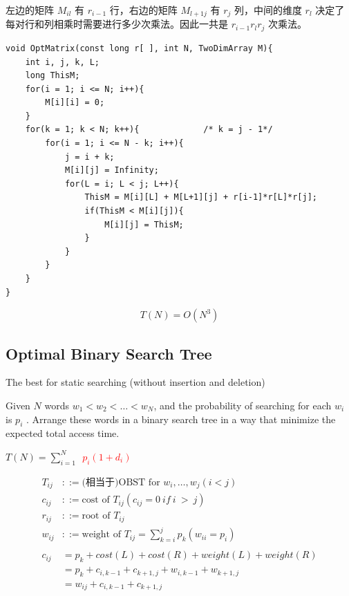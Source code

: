 \documentclass{article}
\begin{document}
左边的矩阵 $M_{il}$ 有 $r_{i-1}$ 行，右边的矩阵 $M_{l+1j}$ 有 $r_j$ 列，中间的维度 $r_l$ 决定了每对行和列相乘时需要进行多少次乘法。因此一共是 $r_{i-1}r_l r_j$ 次乘法。

\hspace*{\fill} \par

\begin{lstlisting}
void OptMatrix(const long r[ ], int N, TwoDimArray M){
    int i, j, k, L;
    long ThisM;
    for(i = 1; i <= N; i++){
        M[i][i] = 0;
    }
    for(k = 1; k < N; k++){             /* k = j - 1*/
        for(i = 1; i <= N - k; i++){
            j = i + k;
            M[i][j] = Infinity;
            for(L = i; L < j; L++){
                ThisM = M[i][L] + M[L+1][j] + r[i-1]*r[L]*r[j];
                if(ThisM < M[i][j]){
                    M[i][j] = ThisM;
                }
            }
        }
    }
}
\end{lstlisting}

$$T(N) = O(N^3)$$

\subsection{Optimal Binary Search Tree}
The best for static searching (without insertion and deletion)\par
Given  $N$  words  $w_1 < w_2 < \dots < w_N$, and the probability of searching for each  $w_i$  is  $p_i$ .  Arrange these words in a binary search tree in a way that minimize the expected total access time.
\hspace*{\fill} \par

$T(N)=\sum\limits_{i=1}^N$\ \textcolor{red}{$p_i(1+d_i)$}

\hspace*{\fill}

\begin{align*}
    T_{ij}&::=\text{(相当于)}\text{OBST for }w_i,\dots,w_j(i<j)\\
    c_{ij}&::=\text{cost of }T_{ij}(c_{ij}=0 \ if \ i \ > \ j)\\
    r_{ij}&::=\text{root of }T_{ij}\\
    w_{ij}&::=\text{weight of }T_{ij}=\sum_{k=i}^j p_k (w_{ii}=p_i)\\\\
    c_{ij}&=p_k + cost(L) + cost(R) + weight(L) + weight(R)\\
          &= p_k + c_{i,k-1} + c_{k+1,j} + w_{i,k-1} + w_{k+1,j}\\
          &= w_{ij} + c_{i,k-1} + c_{k+1,j}
\end{align*}\par
\end{document}
